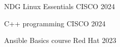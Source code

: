

\begin{cvhonors}

  \cvhonor
    {NDG Linux Essentials} %
    {CISCO} %
    {} %
    {2024} %

  \cvhonor
    {C++ programming  } %
    {CISCO} %
    {} %
    {2024} %

  \cvhonor
    {Ansible Basics course} %
    {Red Hat} %
    {} %
    {2023} %

\end{cvhonors}
